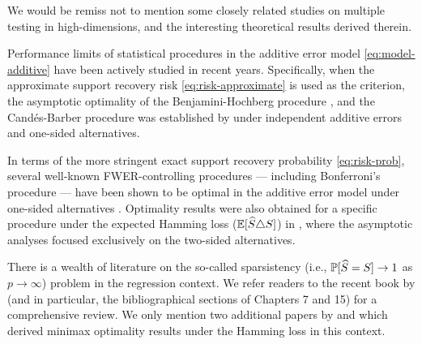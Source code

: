 

We would be remiss not to mention some closely related studies on multiple testing in high-dimensions, and the interesting theoretical results derived therein.

Performance limits of statistical procedures in the additive error model \eqref{eq:model-additive} have been actively studied in recent years.
Specifically, when the approximate support recovery risk \eqref{eq:risk-approximate} is used as the criterion, the asymptotic optimality of the Benjamini-Hochberg procedure \cite{benjamini1995controlling}, and the Cand\'es-Barber procedure \cite{barber2015controlling} was established by \citet*{arias2017distribution} under independent additive errors and one-sided alternatives.

In terms of the more stringent exact support recovery probability \eqref{eq:risk-prob}, several well-known FWER-controlling procedures --- including Bonferroni's procedure --- have been shown to be optimal in the additive error model under one-sided alternatives \cite{gao2018fundamental}.
Optimality results were also obtained for a specific procedure under the expected Hamming loss ($\E[\widehat{S}\triangle S]$) in \cite{butucea2018variable},
where the asymptotic analyses focused exclusively on the two-sided alternatives.

There is a wealth of literature on the so-called sparsistency (i.e., $\P[\widehat{S} = S]\to 1$ as $p\to\infty$) problem in the regression context. 
We refer readers to the recent book by \citet{wainwright2019high} (and in particular, the bibliographical sections of Chapters 7 and 15) for a comprehensive review.
We only mention two additional papers by \citet{ji2012ups} and \citet{jin2014optimality} which derived minimax optimality results under the Hamming loss in this context.

